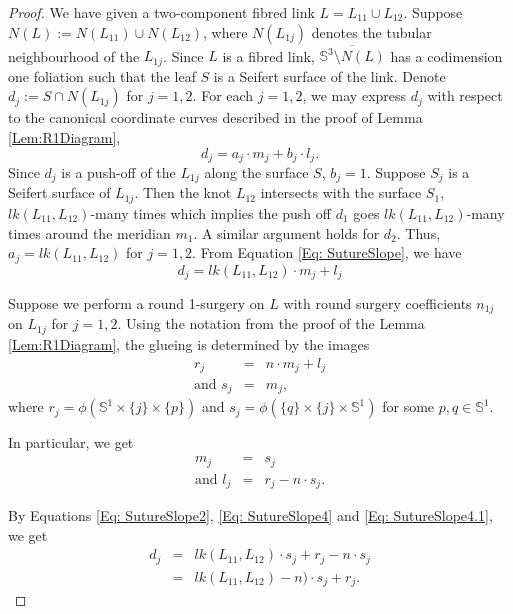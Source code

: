 \documentclass{amsart}
\theoremstyle{plain}
\theoremstyle{remark}
\theoremstyle{definition}
\newcommand{\s}{\mathbb{S}}
\begin{document}
\begin{proof}
We have given a two-component fibred link $L= L_{11} \cup L_{12}$. 
Suppose $N(L):= N(L_{11}) \cup N(L_{12})$, where $N(L_{1j})$ denotes the tubular neighbourhood of the  $L_{1j}$. 
Since $L$ is a fibred link, $\overline{\s^3 \setminus N(L)} $ has a codimension one foliation such that the leaf $S$ is a Seifert surface of the link.
Denote $d_j:= S\cap N(L_{1j})$ for $j=1, 2$. 
For each $j=1,2$, we may express $d_j$ with respect to the canonical coordinate curves described in the proof of Lemma \ref{Lem:R1Diagram}, 
\begin{equation}\label{Eq: SutureSlope}
    d_j= a_j \cdot m_j+ b_j \cdot l_{j}. 
\end{equation}
Since $d_j$ is a push-off of the $L_{1j}$ along the surface $S$, $b_j=1$. 
Suppose $S_j$ is a Seifert surface of $L_{1j}$. Then the knot $L_{12}$ intersects with the surface $S_1$, $lk(L_{11}, L_{12})$-many times which implies the push off $d_1$ goes $lk(L_{11}, L_{12})$-many times around the meridian $m_{1}$. A similar argument holds for $d_2$. Thus, $a_j= lk(L_{11}, L_{12})$ for $j=1,2$. 
From Equation \ref{Eq: SutureSlope}, we have 
\begin{equation} \label{Eq: SutureSlope2}
d_j = lk(L_{11}, L_{12}) \cdot m_{j} + l_{j}
\end{equation}

Suppose we perform a round 1-surgery on $L$ with round surgery coefficients $n_{1j}$ on $L_{1j}$ for $j=1,2$. 
Using the notation from the proof of the Lemma \ref{Lem:R1Diagram}, the glueing is determined by the images
\begin{eqnarray}\label{Eq: SutureSlope3}
    r_{j} &=& n \cdot m_{j} + l_{j}\\
\text{and } s_{j} &=& m_{j}, 
\end{eqnarray}
where $r_{j} = \phi(\s^1 \times \{j\} \times  \{p\})$ and $s_{j}= \phi(\{q\} \times \{j\} \times \s^1)$ for some $p, q\in \s^1$. 


In particular, we get 
\begin{eqnarray}
\label{Eq: SutureSlope4}
    m_{j}&=& s_{j}\\
\label{Eq: SutureSlope4.1}    \text{and } l_{j}&=& r_{j}- n\cdot s_{j}.
\end{eqnarray}

By Equations \ref{Eq: SutureSlope2}, \ref{Eq: SutureSlope4} and \ref{Eq: SutureSlope4.1}, we get 
\begin{eqnarray*}
    d_j &=& lk(L_{11}, L_{12})\cdot s_{j} + r_{j} - n \cdot s_{j}\\
    &=& lk(L_{11}, L_{12}) - n)\cdot s_{j} + r_{j}. 
\end{eqnarray*}


\end{proof}
\end{document}
